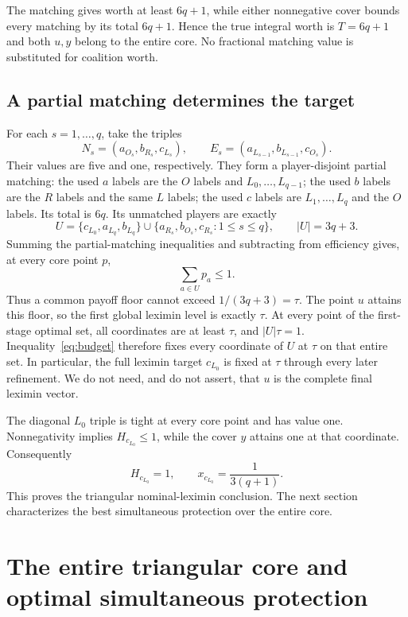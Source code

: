 \documentclass[11pt]{article}
\theoremstyle{remark}\newtheorem{remark}[theorem]{Remark}
\begin{document}
The matching gives worth at least $6q+1$, while either nonnegative
cover bounds every matching by its total $6q+1$. Hence the true integral
worth is $T=6q+1$ and both $u,y$ belong to the entire core. No fractional
matching value is substituted for coalition worth.

\subsection{A partial matching determines the target}
For each $s=1,\ldots,q$, take the triples
\[
 N_s=(a_{O_s},b_{R_s},c_{L_s}),\qquad
 E_s=(a_{L_{s-1}},b_{L_{s-1}},c_{O_s}).
\]
Their values are five and one, respectively. They form a player-disjoint
partial matching: the used $a$ labels are the $O$ labels and
$L_0,\ldots,L_{q-1}$; the used $b$ labels are the $R$ labels and the same
$L$ labels; the used $c$ labels are $L_1,\ldots,L_q$ and the $O$ labels.
Its total is $6q$. Its unmatched players are exactly
\begin{equation}\label{eq:unmatched}
 U=\{c_{L_0},a_{L_q},b_{L_q}\}
       \cup\{a_{R_s},b_{O_s},c_{R_s}:1\leq s\leq q\},
       \qquad |U|=3q+3.
\end{equation}
Summing the partial-matching inequalities and subtracting from efficiency
gives, at every core point $p$,
\begin{equation}\label{eq:budget}
                       \sum_{a\in U}p_a\leq1.
\end{equation}
Thus a common payoff floor cannot exceed $1/(3q+3)=\tau$. The point
$u$ attains this floor, so the first global leximin level is exactly
$\tau$. At every point of the first-stage optimal set, all coordinates are
at least $\tau$, and $|U|\tau=1$. Inequality~\eqref{eq:budget} therefore
fixes every coordinate of $U$ at $\tau$ on that entire set. In particular,
the full leximin target $c_{L_0}$ is fixed at $\tau$ through every later
refinement. We do not need, and do not assert, that $u$ is the complete
final leximin vector.

The diagonal $L_0$ triple is tight at every core point and has value one.
Nonnegativity implies $H_{c_{L_0}}\leq1$, while the cover $y$ attains
one at that coordinate. Consequently
\[
       H_{c_{L_0}}=1,\qquad x_{c_{L_0}}=\frac{1}{3(q+1)}.
\]
This proves the triangular nominal-leximin conclusion. The next section
characterizes the best simultaneous protection over the entire core.

\section{The entire triangular core and optimal simultaneous protection}
\end{document}
